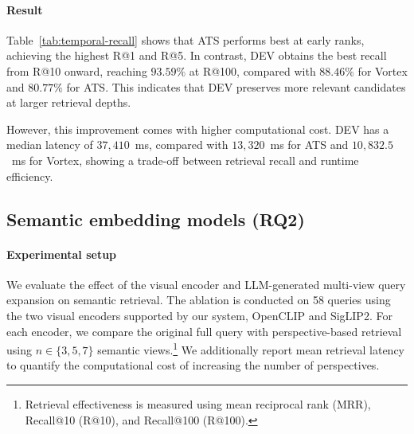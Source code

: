 \documentclass[runningheads]{llncs}
\begin{document}
\paragraph{Result}
Table~\ref{tab:temporal-recall} shows that ATS performs best at early
ranks, achieving the highest R@1 and R@5. In contrast, DEV obtains the
best recall from R@10 onward, reaching $93.59\%$ at R@100, compared
with $88.46\%$ for Vortex and $80.77\%$ for ATS. This indicates that
DEV preserves more relevant candidates at larger retrieval depths.

However, this improvement comes with higher computational cost.
DEV has a median latency of $37{,}410$~ms, compared with
$13{,}320$~ms for ATS and $10{,}832.5$~ms for Vortex, showing a
trade-off between retrieval recall and runtime efficiency.



\subsection{Semantic embedding models (RQ2)}

\paragraph{Experimental setup} We evaluate the effect of the visual encoder and LLM-generated
multi-view query expansion on semantic retrieval. The ablation
is conducted on 58 queries using the two visual encoders supported by
our system, OpenCLIP and SigLIP2. For each encoder, we compare the
original full query with perspective-based retrieval using
$n \in \{3,5,7\}$ semantic views.\footnote{Retrieval effectiveness is measured
using mean reciprocal rank (MRR), Recall@10 (R@10), and Recall@100
(R@100).} We additionally report mean retrieval latency to quantify the
computational cost of increasing the number of perspectives.
\end{document}
